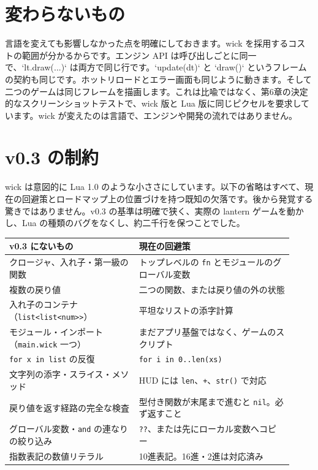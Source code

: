 \section{変わらないもの}

言語を変えても影響しなかった点を明確にしておきます。wick を採用するコストの範囲が分かるからです。エンジン API は呼び出しごとに同一で、`lt.draw(...)` は両方で同じ行です。`update(dt)` と `draw()` というフレームの契約も同じです。ホットリロードとエラー画面も同じように動きます。そして二つのゲームは同じフレームを描画します。これは比喩ではなく、第6章の決定的なスクリーンショットテストで、wick 版と Lua 版に同じピクセルを要求しています。wick が変えたのは言語で、エンジンや開発の流れではありません。

\section{v0.3 の制約}

wick は意図的に Lua 1.0 のような小ささにしています。以下の省略はすべて、現在の回避策とロードマップ上の位置づけを持つ既知の欠落です。後から発覚する驚きではありません。v0.3 の基準は明確で狭く、実際の lantern ゲームを動かし、Lua の種類のバグをなくし、約二千行を保つことでした。

\begin{center}
\begin{tabular}{@{}p{0.42\linewidth}p{0.50\linewidth}@{}}
\toprule
\textbf{v0.3 にないもの} & \textbf{現在の回避策} \\
\midrule
クロージャ、入れ子・第一級の関数 & トップレベルの \texttt{fn} とモジュールのグローバル変数 \\
複数の戻り値 & 二つの関数、または戻り値の外の状態 \\
入れ子のコンテナ（\texttt{list<list<num>>}） & 平坦なリストの添字計算 \\
モジュール・インポート（\texttt{main.wick} 一つ） & まだアプリ基盤ではなく、ゲームのスクリプト \\
\texttt{for x in list} の反復 & \texttt{for i in 0..len(xs)} \\
文字列の添字・スライス・メソッド & HUD には \texttt{len}、\texttt{+}、\texttt{str()} で対応 \\
戻り値を返す経路の完全な検査 & 型付き関数が末尾まで進むと \texttt{nil}。必ず返すこと \\
グローバル変数・\texttt{and} の連なりの絞り込み & \texttt{??}、または先にローカル変数へコピー \\
指数表記の数値リテラル & 10進表記。16進・2進は対応済み \\
\bottomrule
\end{tabular}
\end{center}

